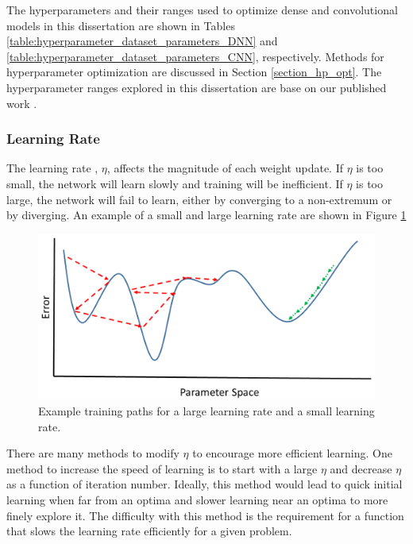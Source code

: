 The hyperparameters and their ranges used to optimize dense and convolutional models in this dissertation are shown in Tables \ref{table:hyperparameter_dataset_parameters_DNN} and \ref{table:hyperparameter_dataset_parameters_CNN}, respectively. Methods for hyperparameter  optimization are discussed in Section \ref{section_hp_opt}. The hyperparameter ranges explored in this dissertation are base on our published work \cite{kamuda2017, kamuda2018, kamudaThesis2017}.

\subsubsection{Learning Rate} \label{LearningRateSubsection}

The learning rate , $\eta$, affects the magnitude of each weight update. If $\eta$ is too small, the network will learn slowly and training will be inefficient. If $\eta$ is too large, the network will fail to learn, either by converging to a non-extremum or by diverging. An example of a small and large learning rate are shown in Figure \ref{fig:Learning_rate_comparison} 

\begin{figure}[H]
	\centering
	\includegraphics[width=0.8\linewidth]{images/Learning_rate_comparison_v2}
	\caption{Example training paths for a large learning rate and a small learning rate.}
	\label{fig:Learning_rate_comparison}
\end{figure}


There are many methods to modify $\eta$ to encourage more efficient learning. One method to increase the speed of learning is to start with a large $\eta$ and decrease $\eta$ as a function of iteration number. Ideally, this method would lead to quick initial learning when far from an optima and slower learning near an optima to more finely explore it. The difficulty with this method is the requirement for a function that slows the learning rate efficiently for a given problem.

